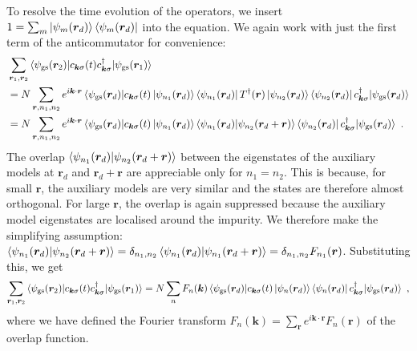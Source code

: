To resolve the time evolution of the operators, we insert $1 = \sum_m \ket{\psi_m({\bm r_d})}\bra{\psi_m({\bm r_d})}$ into the equation. We again work with just the first term of the anticommutator for convenience:
\begin{equation}\begin{aligned}
	&\sum_{\bm r_1,\bm r_2} \braket{\psi_\text{gs}({\bm r_2}) | c_{{\bm k}\sigma}(t) c^\dagger_{{\bm k}\sigma} | \psi_\text{gs}({\bm r_1})} \\
	&= N\sum_{\bm r, n_1, n_2} e^{i\bm k \cdot\bm r} \braket{\psi_\text{gs}({\bm r_d}) | c_{{\bm k}\sigma}(t) \ket{\psi_{n_1}({\bm r_d})}\bra{\psi_{n_1}({\bm r_d})} T^\dagger(\bm r) \ket{\psi_{n_2}({\bm r_d})}\bra{\psi_{n_2}({\bm r_d})} c^\dagger_{{\bm k}\sigma} | \psi_\text{gs}({\bm r_d})}\\
	&= N\sum_{\bm r, n_1, n_2} e^{i\bm k \cdot\bm r} \braket{\psi_\text{gs}({\bm r_d}) | c_{{\bm k}\sigma}(t) \ket{\psi_{n_1}({\bm r_d})}\braket{\psi_{n_1}({\bm r_d}) | \psi_{n_2}({\bm r_d + \bm r})}\bra{\psi_{n_2}({\bm r_d})} c^\dagger_{{\bm k}\sigma} | \psi_\text{gs}({\bm r_d})}~.
\end{aligned}\end{equation}
The overlap \(\braket{\psi_{n_1}({\bm r_d}) | \psi_{n_2}({\bm r_d + \bm r})}\) between the eigenstates of the auxiliary models at \(\bm r_d\) and \(\bm r_d + \bm r\) are appreciable only for \(n_1 = n_2\). This is because, for small \(\bm r\), the auxiliary models are very similar and the states are therefore almost orthogonal. For large \(\bm r\), the overlap is again suppressed because the auxiliary model eigenstates are localised around the impurity. We therefore make the simplifying assumption: \(\braket{\psi_{n_1}({\bm r_d}) | \psi_{n_2}({\bm r_d + \bm r})} = \delta_{n_1, n_2}\braket{\psi_{n_1}({\bm r_d}) | \psi_{n_1}({\bm r_d + \bm r})} = \delta_{n_1, n_2}F_{n_1}(\bm r)\). Substituting this, we get
\begin{equation}\begin{aligned}\label{intermediate}
	\sum_{\bm r_1,\bm r_2} \braket{\psi_\text{gs}({\bm r_2}) | c_{{\bm k}\sigma}(t) c^\dagger_{{\bm k}\sigma} | \psi_\text{gs}({\bm r_1})} = N\sum_{n} F_n(\bm k) \braket{\psi_\text{gs}({\bm r_d}) | c_{{\bm k}\sigma}(t) \ket{\psi_{n}({\bm r_d})}\bra{\psi_{n}({\bm r_d})} c^\dagger_{{\bm k}\sigma} | \psi_\text{gs}({\bm r_d})}~,
\end{aligned}\end{equation}
where we have defined the Fourier transform \(F_n(\bm k) = \sum_{\bm r} e^{i\bm k \cdot\bm r} F_n(\bm r)\) of the overlap function.

